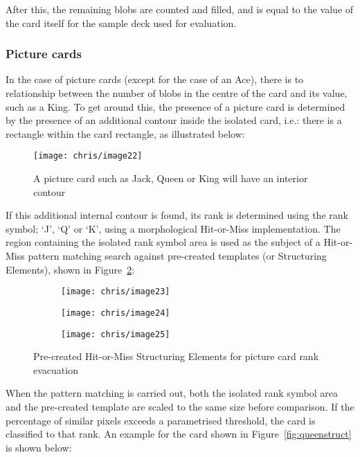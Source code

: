 			After this, the remaining blobs are counted and filled, and is equal to the value of the card itself for the sample deck used for evaluation.

		\subsubsection{Picture cards}
			In the case of picture cards (except for the case of an Ace), there is to relationship between the number of blobs in the centre of the card and its value, such as a King. To get around this, the presence of a picture card is determined by the presence of an additional contour inside the isolated card, i.e.: there is a rectangle within the card rectangle, as illustrated below:

			\begin{figure}[H]
				\centering
				\texttt{[image: chris/image22]}
				\caption{A picture card such as Jack, Queen or King will have an interior contour}
				\label{fig:innercont}
			\end{figure}

			If this additional internal contour is found, its rank is determined using the rank symbol; `J', `Q' or `K', using a morphological Hit-or-Miss implementation. The region containing the isolated rank symbol area is used as the subject of a Hit-or-Miss pattern matching search against pre-created templates (or Structuring Elements), shown in Figure~\ref{fig:picstruct}:

			\begin{figure}[H]
				\centering
				\begin{subfigure}[b]{0.14\textwidth}
					\centering
					\texttt{[image: chris/image23]}
					\caption{}
				\end{subfigure}
				\begin{subfigure}[b]{0.15\textwidth}
					\centering
					\texttt{[image: chris/image24]}
					\caption{}
				\end{subfigure}
				\begin{subfigure}[b]{0.14\textwidth}
					\centering
					\texttt{[image: chris/image25]}
					\caption{}
				\end{subfigure}
				\caption{Pre-created Hit-or-Miss Structuring Elements for picture card rank evacuation}
				\label{fig:picstruct}
			\end{figure}

			When the pattern matching is carried out, both the isolated rank symbol area and the pre-created template are scaled to the same size before comparison. If the percentage of similar pixels exceeds a parametrised threshold, the card is classified to that rank. An example for the card shown in Figure~\ref{fig:queenstruct} is shown below:

